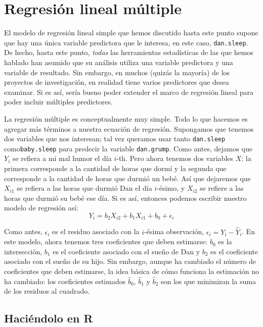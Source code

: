 \documentclass[
]{book}
\begin{document}
\hypertarget{multipleregression}{%
\section{Regresión lineal múltiple}\label{multipleregression}}

El modelo de regresión lineal simple que hemos discutido hasta este punto supone que hay una única variable predictora que le interesa, en este caso, \texttt{dan.sleep}. De hecho, hasta este punto, \emph{todas} las herramientas estadísticas de las que hemos hablado han asumido que su análisis utiliza una variable predictora y una variable de resultado. Sin embargo, en muchos (quizás la mayoría) de los proyectos de investigación, en realidad tiene varios predictores que desea examinar. Si es así, sería bueno poder extender el marco de regresión lineal para poder incluir múltiples predictores.

La regresión múltiple es conceptualmente muy simple. Todo lo que hacemos es agregar más términos a nuestra ecuación de regresión. Supongamos que tenemos dos variables que nos interesan; tal vez queramos usar tanto \texttt{dan.sleep} como\texttt{baby.sleep} para predecir la variable \texttt{dan.grump}. Como antes, dejamos que \(Y_i\) se refiera a mi mal humor el día \(i\)-th. Pero ahora tenemos dos variables \(X\): la primera corresponde a la cantidad de horas que dormí y la segunda que corresponde a la cantidad de horas que durmió un bebé. Así que dejaremos que \(X_{i1}\) se refiera a las horas que durmió Dan el día \(i\)-ésimo, y \(X_{i2}\) se refiere a las horas que durmió su bebé ese día. Si es así, entonces podemos escribir nuestro modelo de regresión así:
\[
Y_i = b_2 X_{i2} + b_1 X_{i1} + b_0 + \epsilon_i
\]

Como antes, \(\epsilon_i\) es el residuo asociado con la \(i\)-ésima observación, \(\epsilon_i={Y}_i-\hat{Y}_i\). En este modelo, ahora tenemos tres coeficientes que deben estimarse: \(b_0\) es la intersección, \(b_1\) es el coeficiente asociado con el sueño de Dan y \(b_2\) es el coeficiente asociado con el sueño de su hijo. Sin embargo, aunque ha cambiado el número de coeficientes que deben estimarse, la idea básica de cómo funciona la estimación no ha cambiado: los coeficientes estimados \(\hat{b}_0\), \(\hat{b}_1\) y \(\hat{b}_2\) son los que minimizan la suma de los residuos al cuadrado.

\hypertarget{haciuxe9ndolo-en-r}{%
\subsection{Haciéndolo en R}\label{haciuxe9ndolo-en-r}}
\end{document}
